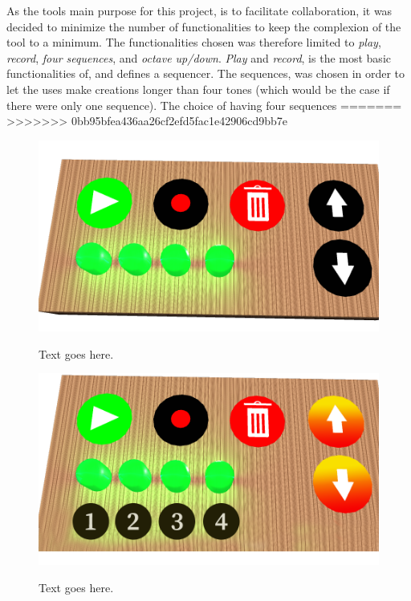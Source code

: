 As the tools main purpose for this project, is to facilitate collaboration, it was decided to minimize the number of functionalities to keep the complexion of the tool to a minimum. The functionalities chosen was therefore limited to \textit{play}, \textit{record}, \textit{four sequences}, and \textit{octave up/down}. \textit{Play} and \textit{record}, is the most basic functionalities of, and defines a sequencer. The sequences, was chosen in order to let the uses make creations longer than four tones (which would be the case if there were only one sequence). The choice of having four sequences  
=======
>>>>>>> 0bb95bfea436aa26cf2efd5fac1e42906cd9bb7e

\begin{figure}[H]
	\centering
	\includegraphics[width=0.7\linewidth]{figure/Design/buttonDesign}
	\label{fig:buttonDesign}
	\caption{Text goes here.}	
\end{figure}

\begin{figure}[H]
	\centering
	\includegraphics[width=0.7\linewidth]{figure/Design/buttonDesign2}
	\label{fig:buttonDesign2}
	\caption{Text goes here.}	
\end{figure}




